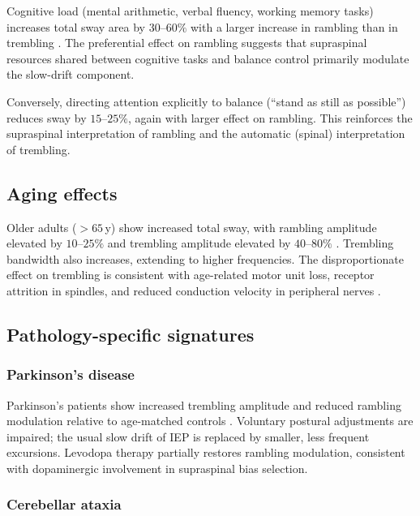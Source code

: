 \documentclass[11pt,twocolumn,a4paper]{article}
\theoremstyle{definition}
\theoremstyle{remark}
\begin{document}
Cognitive load (mental arithmetic, verbal fluency, working memory
tasks) increases total sway area by $30$--$60\%$ with a larger
increase in rambling than in trembling \citep{lajoie1993,%
woollacott2002,pellecchia2003,huxhold2006}. The preferential effect
on rambling suggests that supraspinal resources shared between
cognitive tasks and balance control primarily modulate the
slow-drift component.

Conversely, directing attention explicitly to balance (``stand as
still as possible'') reduces sway by $15$--$25\%$, again with
larger effect on rambling. This reinforces the supraspinal
interpretation of rambling and the automatic (spinal) interpretation
of trembling.

\subsection{Aging effects}

Older adults ($>65$\,y) show increased total sway, with rambling
amplitude elevated by $10$--$25\%$ and trembling amplitude elevated
by $40$--$80\%$ \citep{prieto1996,maurer2005,pellecchia2003}.
Trembling bandwidth also increases, extending to higher frequencies.
The disproportionate effect on trembling is consistent with
age-related motor unit loss, receptor attrition in spindles, and
reduced conduction velocity in peripheral nerves
\citep{gilchrist1995,shaffer2007}.

\subsection{Pathology-specific signatures}

\subsubsection{Parkinson's disease}

Parkinson's patients show increased trembling amplitude and
reduced rambling modulation relative to age-matched controls
\citep{mancini2012,schmit2006}. Voluntary postural adjustments are
impaired; the usual slow drift of IEP is replaced by smaller,
less frequent excursions. Levodopa therapy partially restores
rambling modulation, consistent with dopaminergic involvement in
supraspinal bias selection.

\subsubsection{Cerebellar ataxia}
\end{document}

